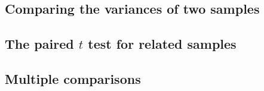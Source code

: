 \documentclass[t]{beamer} %
\begin{document}
\begin{frame}[fragile]
  \frametitle{}

  \begin{alltt}
  \end{alltt}
\end{frame}

\subsection{Comparing the variances of two samples}

\begin{frame}
  \frametitle{}

\end{frame}

\begin{frame}[fragile]
  \frametitle{}

  \begin{alltt}
  \end{alltt}
\end{frame}

\subsection{The paired $t$ test for related samples}

\begin{frame}
  \frametitle{}

\end{frame}

\begin{frame}[fragile]
  \frametitle{}

  \begin{alltt}
  \end{alltt}
\end{frame}

\subsection{Multiple comparisons}

\begin{frame}
  \frametitle{}

\end{frame}
\end{document}
